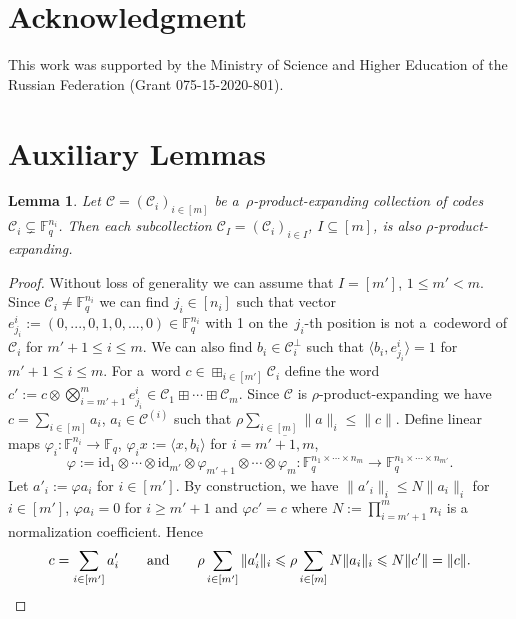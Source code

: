 \documentclass[11pt]{article}
\let\le\leqslant
\let\ge\geqslant
\let\phi\varphi
\theoremstyle{plain}
\newtheorem{lemma}{Lemma}
\theoremstyle{definition}
\theoremstyle{remark}
\newcommand{\id}{\mathrm{id}}
\newcommand{\cC}{\mathcal{C}}
\newcommand{\F}{\mathbb{F}}
\begin{document}
\section*{Acknowledgment}

This work was supported by the Ministry of Science and Higher Education of the Russian Federation (Grant 075-15-2020-801).


%



\appendix

\section{Auxiliary Lemmas}\label{sc:auxlemmas}

\begin{lemma}\label{lemma:subset-exp}
Let $\cC=(\cC_i)_{i\in [m]}$ be a~$\rho$-product-expanding collection of codes $\cC_i\subsetneq \F_q^{n_i}$. Then each subcollection $\cC_I=(\cC_i)_{i\in I}$, $I\subseteq [m]$, is also $\rho$-product-expanding.
\end{lemma}
\begin{proof}
    Without loss of generality we can assume that $I=[m']$, $1\le m'<m$.
    Since $\cC_i\neq \F_q^{n_i}$ we can find %
    $j_i\in [n_i]$ such that vector $e^i_{j_i}:=(0,...,0,1,0,...,0)\in \F_q^{n_i}$ with 1 on the~$j_i$-th position is not a~codeword of $\cC_i$ for $m'+1\le i\le m$. We can also find $b_i\in \cC_i^\bot$ such that $\langle b_i,e^i_{j_i}\rangle=1$ for $m'+1\le i\le m$.
    For a~word $c\in \boxplus_{i\in [m']}\cC_i$ define the word $c':=c\otimes \bigotimes_{i=m'+1}^{m}e^i_{j_i}\in \cC_1\boxplus\cdots\boxplus\cC_m$.
    Since $\cC$ is $\rho$-product-expanding we have $c=\sum_{i\in[m]}a_i$, $a_i\in \cC^{(i)}$ such that $\rho\sum_{i\in [m]}\|a\|_i\le \|c\|$.
    Define linear maps $\phi_i:\F_q^{n_i}\to \F_q$, $\phi_i x:=\langle x,b_i\rangle$ for $i=\overline{m'+1,m}$, 
    $$\phi:=\id_1\otimes \cdots\otimes \id_{m'}\otimes \phi_{m'+1}\otimes\cdots\otimes \phi_m:\F_q^{n_1\times \cdots\times n_m}\to \F_q^{n_1\times \cdots\times n_{m'}}.$$ Let $a'_i := \phi a_i$ for $i\in[m']$. By construction, we have $\|a'_i\|_i\le N\|a_i\|_i$ for $i\in [m']$, $\phi a_i=0$ for $i\ge m'+1$ and $\phi c'=c$ where $N:=\prod_{i=m'+1}^m n_{i}$ is a normalization coefficient. Hence %
    \[
    c=\sum_{i\in[m']}a'_i\qquad\mbox{and}\qquad
    \rho\sum_{i\in [m']}\|a'_i\|_i\le \rho \sum_{i\in [m]}N\|a_i\|_i\le  N\|c'\|=\|c\|.
    \qedhere
    \]
\end{proof}
\end{document}

